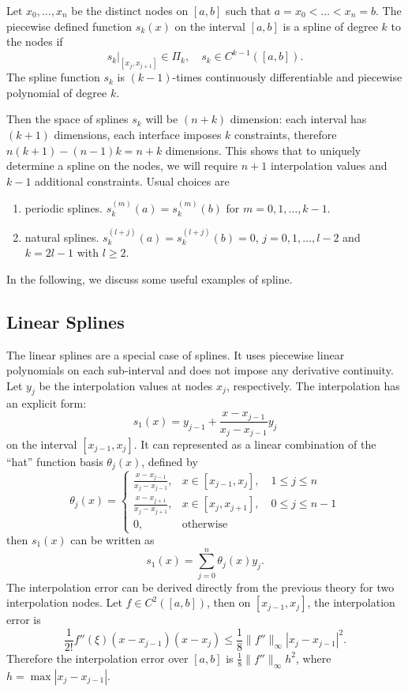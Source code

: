 \begin{definition}
    Let $x_0, \dots, x_n$ be the distinct nodes on $[a, b]$ such that $a = x_0 <\dots < x_n = b$. The piecewise defined function $s_k(x)$ on the interval $[a, b]$ is a spline of degree $k$ to the nodes if  
    \begin{equation}
        s_k|_{[x_j, x_{j+1}]} \in \Pi_k, \quad s_k\in C^{k-1}([a, b]).
    \end{equation}
    The spline function $s_k$ is $(k-1)$-times continuously differentiable and piecewise polynomial of degree $k$.
\end{definition}
Then the space of splines $s_k$ will be $(n + k)$ dimension: each interval has $(k+1)$ dimensions, each interface imposes $k$ constraints, therefore $n (k+ 1) - (n-1) k = n + k$ dimensions. This shows that to uniquely determine a spline on the nodes, we will require $n+1$ interpolation values and $k-1$ additional constraints. Usual choices are
\begin{enumerate}
    \item periodic splines. $s_k^{(m)}(a) = s_k^{(m)}(b)$ for $m = 0, 1, \dots, k-1$.
    \item natural splines. $s_k^{(l+j)}(a) = s_k^{(l+j)}(b) = 0$, $j = 0, 1,\dots, l-2$ and $k = 2l-1$ with $l\ge 2$.
\end{enumerate}
In the following, we discuss some useful examples of spline. 
\subsection{Linear Splines}
The linear splines are a special case of splines. It uses piecewise linear polynomials on each sub-interval and does not impose any derivative continuity. Let $y_j$ be the interpolation values at nodes $x_j$, respectively. The interpolation has an explicit form:
\begin{equation}
    s_1(x) = y_{j-1} + \frac{x - x_{j-1}}{x_j - x_{j-1}} y_j
\end{equation}
on the interval $[x_{j-1}, x_j]$. It can represented as a linear combination of the ``hat'' function basis $\theta_j(x)$, defined by
\begin{equation}
    \theta_j(x) = \begin{cases}
        \frac{x - x_{{j-1}}}{x_j - x_{j-1}}, & x\in [x_{j-1}, x_{j}],\quad 1\le j\le n\\
         \frac{x - x_{j+1}}{x_j - x_{j+1}}, & x\in [x_j, x_{j+1}],\quad 0\le j\le n-1\\
         0, & \text{otherwise}
    \end{cases}
\end{equation}
then $s_1(x)$ can be written as 
$$s_1(x) = \sum_{j=0}^n \theta_j(x) y_j.$$
The interpolation error can be derived directly from the previous theory for two interpolation nodes. Let $f\in C^2([a, b])$, then on $[x_{j-1}, x_j]$, the interpolation error is 
\begin{equation}
    \frac{1}{2!}f''(\xi) (x - x_{j-1})(x - x_j) \le \frac{1}{8} \|f''\|_{\infty} |x_j - x_{j-1}|^2.
\end{equation}
Therefore the interpolation error over $[a, b]$ is $\frac{1}{8} \|f''\|_{\infty} h^2$, where $h = \max|x_j - x_{j-1}|$.

